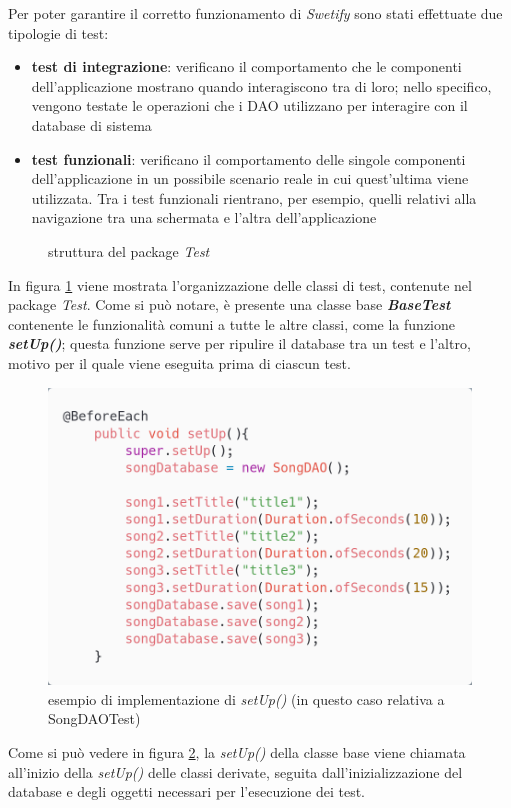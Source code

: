 \documentclass{article}
\begin{document}
  Per poter garantire il corretto funzionamento di \textit{Swetify} sono stati effettuate due tipologie di test:
  \begin{itemize}
    \item \textbf{test di integrazione}: verificano il comportamento che le componenti dell'applicazione mostrano quando interagiscono tra di loro; nello specifico, vengono testate le operazioni che i DAO utilizzano per interagire con il database di sistema
    \item \textbf{test funzionali}: verificano il comportamento delle singole componenti dell'applicazione in un possibile scenario reale in cui quest'ultima viene utilizzata. Tra i test funzionali rientrano, per esempio, quelli relativi alla navigazione tra una schermata e l'altra dell'applicazione
  \end{itemize}

  \begin{figure}[H]
    \centering
    
    \caption{struttura del package \textit{Test}}
    \label{fig:testsUML}
  \end{figure}

  In figura \ref{fig:testsUML} viene mostrata l'organizzazione delle classi di test, contenute nel package \textit{Test}. Come si può notare, è presente una classe base \textbf{\textit{BaseTest}} contenente le funzionalità comuni a tutte le altre classi, come la funzione \textbf{\textit{setUp()}}; questa funzione serve per ripulire il database tra un test e l'altro, motivo per il quale viene eseguita prima di ciascun test.

  \begin{figure}[H]
    \centering
    \includegraphics[width=0.5\linewidth]{setUp.png}
    \caption{esempio di implementazione di \textit{setUp()} (in questo caso relativa a SongDAOTest)}
    \label{fig:setUp}
  \end{figure}


  Come si può vedere in figura \ref{fig:setUp}, la \textit{setUp()} della classe base viene chiamata all'inizio della \textit{setUp()} delle classi
  derivate, seguita dall'inizializzazione del database e degli oggetti necessari per l'esecuzione dei test.
\end{document}
